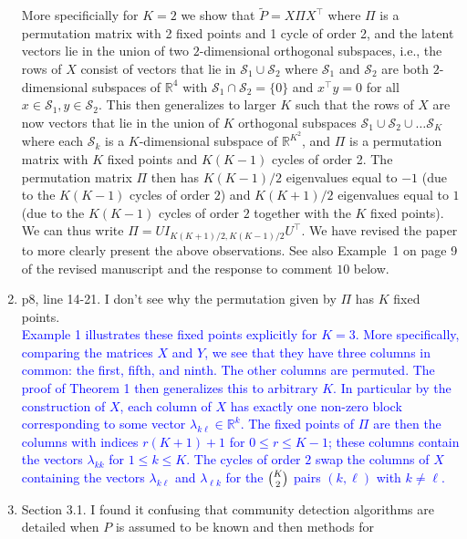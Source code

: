 \documentclass[
]{article}
\begin{document}
\begin{enumerate}
{  More specificially for $K = 2$ we show that $\tilde{P} = X \Pi X^\top$
  where $\Pi$ is a permutation matrix with 2 fixed points and 1 cycle of
  order 2, and the latent vectors lie in the union of two $2$-dimensional
  orthogonal subspaces, i.e., the rows of $X$ consist of
  vectors that lie in $\mathcal{S}_1 \cup \mathcal{S}_2$ where
  $\mathcal{S}_1$ and $\mathcal{S}_2$ are both $2$-dimensional
  subspaces of $\mathbb{R}^{4}$ with $\mathcal{S}_1 \cap \mathcal{S}_2 = \{0\}$ and $x^{\top} y
  = 0$ for all $x \in \mathcal{S}_1, y \in \mathcal{S}_2$. 
  This then generalizes to larger $K$ such that the rows of $X$ are now
  vectors that lie in the union of $K$ orthogonal subspaces
  $\mathcal{S}_1 \cup \mathcal{S}_2 \cup \dots \mathcal{S}_K$ where each
  $\mathcal{S}_k$ is a $K$-dimensional subspace of $\mathbb{R}^{K^2}$,
  and $\Pi$ is a permutation matrix with 
  $K$ fixed points and $K (K - 1)$ cycles of order 2. The permutation
  matrix $\Pi$ then has $K(K-1)/2$ eigenvalues equal to $-1$ (due
  to the $K(K-1)$ cycles of order $2$) and $K(K+1)/2$ eigenvalues equal
  to $1$ (due to the $K(K-1)$ cycles of order $2$ together with the $K$
  fixed points). We can thus write $\Pi = U I_{K(K+1)/2,K(K-1)/2}
  U^{\top}$. We have revised the paper to more clearly present the above
  observations. See also Example~1 on page 9 of the revised manuscript
  and the response to comment $10$ below.
  }
\item
  p8, line 14-21. I don't see why the permutation given by \(\Pi\) has
  \(K\) fixed points.\\
  \textcolor{blue}{
  Example 1 illustrates these fixed points explicitly for $K = 3$. 
  More specifically, comparing the matrices $X$ and $Y$, we see that
  they have three columns in common: the first, fifth, and ninth. 
  The other columns are permuted. The proof of Theorem 1 then
  generalizes this to arbitrary $K$. In particular by the construction
  of $X$, each column of $X$ has exactly one non-zero block
  corresponding to some vector $\lambda_{k \ell} \in \mathbb{R}^{k}$. The fixed
  points of $\Pi$ are then the columns with indices $r(K+1) +1 $ for $0 \leq r
  \leq K-1$; these columns contain the vectors $\lambda_{kk}$ for
  $1 \leq k \leq K$. The cycles of order $2$ swap the columns of $X$
  containing the vectors $\lambda_{k \ell}$ and $\lambda_{\ell k}$ for
  the $\tbinom{K}{2}$ pairs $(k,\ell)$ with $k \not = \ell$. 
  }
\item
  Section 3.1. I found it confusing that community detection algorithms
  are detailed when \(P\) is assumed to be known and then methods for

\end{enumerate}
\end{document}
